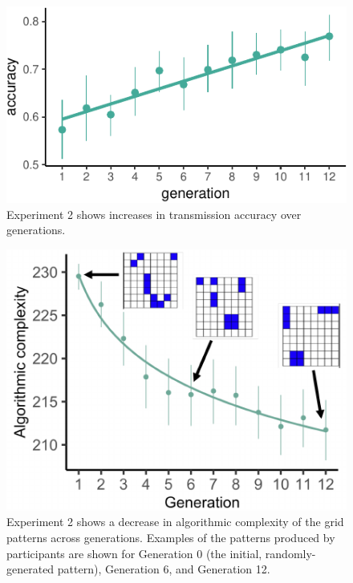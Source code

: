 \documentclass[10pt, letterpaper]{article}
\newenvironment{CodeChunk}{}{}
\begin{document}
\begin{CodeChunk}
\begin{figure}[tb]

{\centering \includegraphics{figs/e2_acc_plot-1} 

}

\caption[Experiment 2 shows increases in transmission accuracy over generations]{Experiment 2 shows increases in transmission accuracy over generations.}\label{fig:e2_acc_plot}
\end{figure}
\end{CodeChunk}

\begin{CodeChunk}
\begin{figure}[tb]

{\centering \includegraphics{figs/e2_withplots-1} 

}

\caption[Experiment 2 shows a decrease in algorithmic complexity of the grid patterns across generations]{Experiment 2 shows a decrease in algorithmic complexity of the grid patterns across generations. Examples of the patterns produced by participants are shown for Generation 0 (the initial, randomly-generated pattern), Generation 6, and Generation 12.}\label{fig:e2_withplots}
\end{figure}
\end{CodeChunk}
\end{document}
